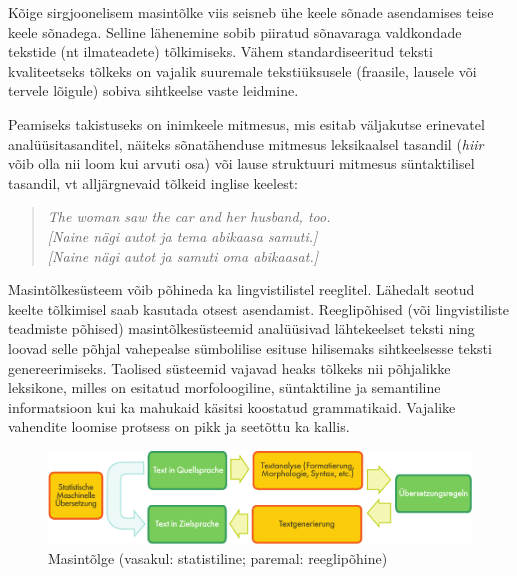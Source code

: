 \documentclass[]{../metanetpaper}
\begin{document}
\begin{multicols}{2}
Kõige sirgjoonelisem masintõlke viis seisneb ühe keele sõnade asendamises teise keele sõnadega. 
Selline lähenemine sobib piiratud sõnavaraga valdkondade tekstide (nt ilmateadete) tõlkimiseks. 
Vähem standardiseeritud teksti kvaliteetseks tõlkeks on vajalik suuremale tekstiüksusele (fraasile, lausele või tervele lõigule) sobiva sihtkeelse vaste leidmine. 


Peamiseks takistuseks on inimkeele mitmesus, mis esitab väljakutse erinevatel analüüsitasanditel, näiteks sõnatähenduse mitmesus leksikaalsel tasandil (\textit{hiir} võib olla nii loom kui arvuti osa) või lause struktuuri mitmesus süntaktilisel tasandil, vt alljärgnevaid tõlkeid inglise keelest: 

\begin{quote}
\textit{The woman saw the car and her husband, too.\\
{[}Naine nägi autot ja tema abikaasa samuti.{]}\\
{[}Naine nägi autot ja samuti oma abikaasat.{]}}
\end{quote}

Masintõlkesüsteem võib põhineda ka lingvistilistel reeglitel. 
Lähedalt seotud keelte tõlkimisel saab kasutada otsest asendamist. 
Reeglipõhised (või lingvistiliste teadmiste põhised) masintõlkesüsteemid analüüsivad lähtekeelset teksti ning loovad selle põhjal vahepealse sümbolilise esituse hilisemaks sihtkeelsesse teksti genereerimiseks. 
Taolised süsteemid vajavad heaks tõlkeks nii põhjalikke leksikone, milles on esitatud morfoloogiline, süntaktiline ja semantiline informatsioon kui ka mahukaid käsitsi koostatud grammatikaid. 
Vajalike vahendite loomise protsess on pikk ja seetõttu ka kallis. 

\begin{figure}[htb]
  \center
  \includegraphics[width=\textwidth]{../_media/german/machine_translation}
  \caption{Masintõlge (vasakul: statistiline; paremal: reeglipõhine)}
  \label{fig:mtarch_ee}
\end{figure}


\end{multicols}
\end{document}
